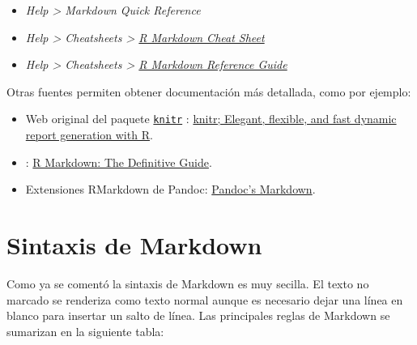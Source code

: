 \documentclass[
]{book}
\theoremstyle{break}
\theoremstyle{nonumberplain}
\begin{document}
\begin{itemize}
\item
  \emph{Help \textgreater{} Markdown Quick Reference}
\item
  \emph{Help \textgreater{} Cheatsheets \textgreater{} \href{https://www.rstudio.org/links/r_markdown_cheat_sheet}{R Markdown Cheat Sheet}}
\item
  \emph{Help \textgreater{} Cheatsheets \textgreater{} \href{https://www.rstudio.com/wp-content/uploads/2015/03/rmarkdown-reference.pdf}{R Markdown Reference Guide}}
\end{itemize}

Otras fuentes permiten obtener documentación más detallada, como por ejemplo:

\begin{itemize}
\item
  Web original del paquete \href{https://yihui.org/knitr/}{\texttt{knitr}} \citep{R-knitr}: \href{https://yihui.name/knitr}{knitr; Elegant, flexible, and fast dynamic report generation with R}.
\item
  \citet{xie2018r} : \href{https://bookdown.org/yihui/rmarkdown}{R Markdown: The Definitive Guide}.
\item
  Extensiones RMarkdown de Pandoc: \href{https://rmarkdown.rstudio.com/authoring_pandoc_markdown.html\%23raw-tex}{Pandoc's Markdown}.
\end{itemize}

\section{Sintaxis de Markdown}\label{markdown}

Como ya se comentó la sintaxis de Markdown es muy secilla.
El texto no marcado se renderiza como texto normal aunque es necesario dejar una línea en blanco para insertar un salto de línea.
Las principales reglas de Markdown se sumarizan en la siguiente tabla:
\end{document}
